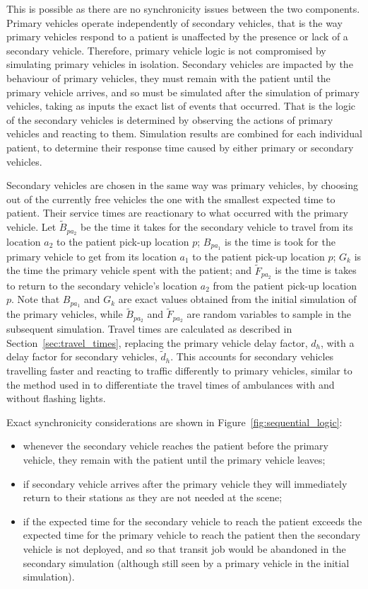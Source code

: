 \documentclass[preprint,12pt]{elsarticle}
\begin{document}
This is possible as there are no synchronicity issues between the two
components. Primary vehicles operate independently of secondary vehicles, that
is the way primary vehicles respond to a patient is unaffected by the presence
or lack of a secondary vehicle.
Therefore, primary vehicle logic is not compromised by simulating primary
vehicles in isolation.
Secondary vehicles are impacted by the behaviour of primary vehicles, they
must remain with the patient until the primary vehicle arrives, and so must be
simulated after the simulation of primary vehicles, taking as inputs the exact
list of events that occurred. That is the logic of the secondary vehicles is
determined by observing the actions of primary vehicles and reacting to them.
Simulation results are combined for each individual patient, to determine
their response time caused by either primary or secondary vehicles.

Secondary vehicles are chosen in the same way was primary vehicles, by choosing
out of the currently free vehicles the one with the smallest expected time to
patient. Their service times are reactionary to what occurred with the primary
vehicle.
Let $\tilde{B}_{pa_2}$ be the time it takes for the secondary vehicle to travel
from its location $a_2$ to the patient pick-up location $p$; $B_{pa_1}$ is the
time is took for the primary vehicle to get from its location $a_1$ to the
patient pick-up location $p$; $G_k$ is the time the primary vehicle spent
with the patient; and $\tilde{F}_{pa_2}$ is the time is takes to return to the
secondary vehicle's location $a_2$ from the patient pick-up location $p$.
Note that $B_{pa_1}$ and $G_k$ are exact values obtained from the
initial simulation of the primary vehicles, while $\tilde{B}_{pa_2}$ and
$\tilde{F}_{pa_2}$ are random variables to sample in the subsequent simulation.
Travel times are calculated as described in Section~\ref{sec:travel_times},
replacing the primary vehicle delay factor, $d_h$, with a delay factor for
secondary vehicles, $\tilde{d}_h$. This accounts for secondary vehicles
travelling faster and reacting to traffic differently to primary vehicles,
similar to the method used in \cite{hendersonmason04} to differentiate the
travel times of ambulances with and without flashing lights.

Exact synchronicity considerations are shown in Figure~\ref{fig:sequential_logic}:
\begin{itemize}
  \item whenever the secondary vehicle reaches the patient before the primary
  vehicle, they remain with the patient until the primary vehicle leaves;
  \item if secondary vehicle arrives after the primary vehicle they will
  immediately return to their stations as they are not needed at the scene;
  \item if the expected time for the secondary vehicle to reach the patient
  exceeds the expected time for the primary vehicle to reach the patient then
  the secondary vehicle is not deployed, and so that transit job would be
  abandoned in the secondary simulation (although still seen by a primary
  vehicle in the initial simulation).
\end{itemize}
\end{document}
